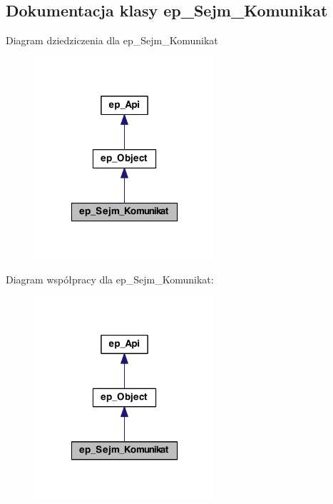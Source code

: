 \hypertarget{classep___sejm___komunikat}{\subsection{Dokumentacja klasy ep\-\_\-\-Sejm\-\_\-\-Komunikat}
\label{classep___sejm___komunikat}
}


Diagram dziedziczenia dla ep\-\_\-\-Sejm\-\_\-\-Komunikat\nopagebreak
\begin{figure}[H]
\begin{center}
\leavevmode
\includegraphics[width=190pt]{classep___sejm___komunikat__inherit__graph}
\end{center}
\end{figure}


Diagram współpracy dla ep\-\_\-\-Sejm\-\_\-\-Komunikat\-:\nopagebreak
\begin{figure}[H]
\begin{center}
\leavevmode
\includegraphics[width=190pt]{classep___sejm___komunikat__coll__graph}
\end{center}
\end{figure}
